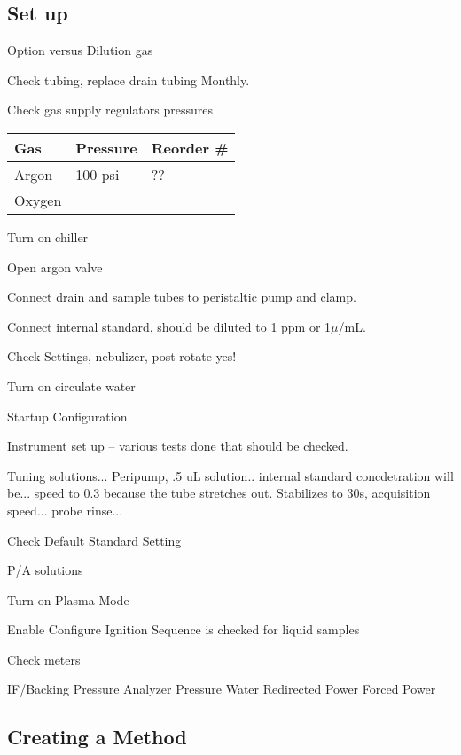 \documentclass[12pt]{../SOP3}\usepackage[]{graphicx}\usepackage[]{color}
\begin{document}
\subsection{Set up}

\NP Option versus Dilution gas

\NP Check tubing, replace drain tubing Monthly.

\NP Check gas supply regulators pressures

\begin{table}[h]
\begin{tabular}{lll} \hline
Gas   &     Pressure    & Reorder \# \\ \hline\hline
Argon &       100 psi   & ??          \\
Oxygen&                 & \\ \hline

\end{tabular}
\end{table}

\NP Turn on chiller

\NP Open argon valve

\NP Connect drain and sample tubes to peristaltic pump and clamp.

\NP Connect internal standard, should be diluted to 1 ppm or 1$\mu$/mL. 

\NP Check Settings, nebulizer, post rotate yes!

\NP Turn on circulate water

\NP Startup Configuration

\NP Instrument set up -- various tests done that should be checked.

\NP Tuning solutions... Peripump, .5 uL solution.. internal standard concdetration will be...  speed to 0.3 because the tube stretches out. Stabilizes to 30s, acquisition speed... probe rinse... 

\NP Check Default Standard Setting

\NP P/A solutions

\NP Turn on Plasma Mode 

\NP Enable Configure Ignition Sequence is checked for liquid samples

\NP Check meters 

IF/Backing Pressure
Analyzer Pressure
Water
Redirected Power
Forced Power



\NP 


\subsection{Creating a Method}
\end{document}
